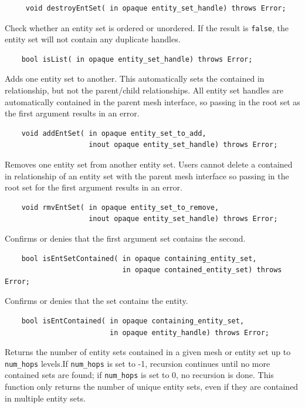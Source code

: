 \documentclass{article}
\begin{document}
\begin{verbatim}
     void destroyEntSet( in opaque entity_set_handle) throws Error;
\end{verbatim}

Check whether an entity set is ordered or unordered. If the result 
is {\tt false}, the entity set will not contain any duplicate handles.

\begin{verbatim}
    bool isList( in opaque entity_set_handle) throws Error;
\end{verbatim}

Adds one entity set to another. This automatically sets 
the contained in relationship, but not the parent/child relationships. 
All entity set handles are automatically contained in the parent 
mesh interface, so passing in the root set as the first argument 
results in an error.

\begin{verbatim}
    void addEntSet( in opaque entity_set_to_add,  
                    inout opaque entity_set_handle) throws Error;
\end{verbatim}

Removes one entity set from another entity set. Users 
cannot delete a contained in relationship of an entity set with 
the parent mesh interface so passing in the root set for the 
first argument results in an error.

\begin{verbatim}
    void rmvEntSet( in opaque entity_set_to_remove, 
                    inout opaque entity_set_handle) throws Error;
\end{verbatim}

Confirms or denies that the first argument set contains the second.

\begin{verbatim}
    bool isEntSetContained( in opaque containing_entity_set,  
                            in opaque contained_entity_set) throws Error;
\end{verbatim}

Confirms or denies that the set contains the entity.

\begin{verbatim}
    bool isEntContained( in opaque containing_entity_set, 
                         in opaque entity_handle) throws Error;
\end{verbatim}


Returns the number of entity sets contained in a given mesh or 
entity set up to {\tt num\_hops} levels.If {\tt num\_hops} is set to -1, recursion 
continues until no more contained sets are found; if {\tt num\_hops} 
is set to 0, no recursion is done. This function only returns 
the number of unique entity sets, even if they are contained 
in multiple entity sets.
\end{document}
